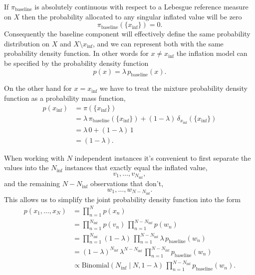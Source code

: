\documentclass[
  letterpaper,
  DIV=11,
  numbers=noendperiod]{scrartcl}
\begin{document}
If \(\pi_{\mathrm{baseline}}\) is absolutely continuous with respect to
a Lebesgue reference measure on \(X\) then the probability allocated to
any singular inflated value will be zero \[
\pi_{\mathrm{baseline}}( \{ x_{\mathrm{inf}} \} ) = 0.
\] Consequently the baseline component will effectively define the same
probability distribution on \(X\) and \(X \setminus x_{\mathrm{inf}}\),
and we can represent both with the same probability density function. In
other words for \(x \ne x_{\mathrm{inf}}\) the inflation model can be
specified by the probability density function \[
p(x)
=
\lambda \, p_{\mathrm{baseline}}(x).
\]

On the other hand for \(x = x_{\mathrm{inf}}\) we have to treat the
mixture probability density function as a probability mass function,
\begin{align*}
p( x_{\mathrm{inf}} )
&=
\pi( \{ x_{\mathrm{inf}} \} )
\\
&=
  \lambda \, \pi_{\mathrm{baseline}}( \{ x_{\mathrm{inf}} \} )
+ (1 - \lambda) \, \delta_{x_{\mathrm{inf}}}( \{ x_{\mathrm{inf}} \} )
\\
&=
  \lambda \, 0
+ (1 - \lambda) \, 1
\\
&=
(1 - \lambda).
\end{align*}

When working with \(N\) independent instances it's convenient to first
separate the values into the \(N_{\mathrm{inf}}\) instances that exactly
equal the inflated value, \[
v_{1}, \ldots, v_{N_{\mathrm{inf}}},
\] and the remaining \(N - N_{\mathrm{inf}}\) observations that don't,
\[
w_{1}, \ldots, w_{N - N_{\mathrm{inf}}}.
\] This allows us to simplify the joint probability density function
into the form \begin{align*}
p(x_{1}, \ldots, x_{N})
&=
\prod_{n = 1}^{N} p(x_{n})
\\
&=
\prod_{n = 1}^{N_{\mathrm{inf}}} p(v_{n}) \,
\prod_{n = 1}^{N - N_{\mathrm{inf}}} p(w_{n})
\\
&=
\prod_{n = 1}^{N_{\mathrm{inf}}}
  (1 - \lambda) \,
\prod_{n = 1}^{N - N_{\mathrm{inf}}}
  \lambda \, p_{\mathrm{baseline}}(w_{n})
\\
&=
(1 - \lambda)^{N_{\mathrm{inf}}} \,
\lambda^{N - N_{\mathrm{inf}}} \,
\prod_{n = 1}^{N - N_{\mathrm{inf}}} p_{\mathrm{baseline}}(w_{n})
\\
&\propto
\mathrm{Binomial}(N_{\mathrm{inf}} \mid N, 1 - \lambda) \,
\prod_{n = 1}^{N - N_{\mathrm{inf}}} p_{\mathrm{baseline}}(w_{n}).
\end{align*}
\end{document}
